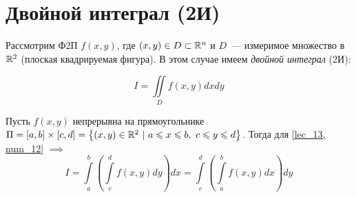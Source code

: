 \documentclass[../../main.tex]{subfiles}
\begin{document}
\section{Двойной интеграл (2И)}

Рассмотрим Ф2П $f \left( x, y \right)$, где 
$\left( x, y \right) \in D \subset \mathbb{R}^n$ и $D$~--- измеримое множество 
в $\mathbb{R}^2$ (плоская квадрируемая фигура). 
В этом случае имеем \emph{двойной интеграл} (2И):

\begin{equation}
	\label{lec_13, num_12}
	I = \iint\limits_{D} f \left( x, y \right) dxdy
\end{equation}

\begin{thm}
    Пусть $f \left( x, y \right)$ непрерывна на прямоугольнике
    $\Pi = \left[a, b\right] \times \left[c, d\right] =  
    \left\{ \left( x, y \right) \in \R^2\ |\ 
    a \leq x \leq b, \ c \leq y \leq d \right\}$.
    Тогда для \eqref{lec_13, num_12} $ \implies $
    \begin{equation}
    \label{lec_13, num_13}
    I = \int\limits_a^b 
    \left( \int\limits_c^d f \left( x, y \right) dy  \right) dx =
     \int\limits_c^d \left( \int\limits_a^b 
     f \left( x, y \right) dx  \right) dy
    \end{equation}
\end{thm}
\end{document}
